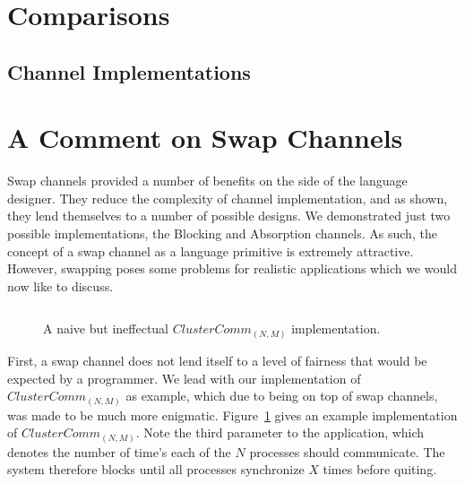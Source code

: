\section{Comparisons}\label{sec:results-comparisons}


\subsection{Channel Implementations}\label{sec:results-channel-implementations}


\section{A Comment on Swap Channels}\label{sec:results-swap-channels}

Swap channels provided a number of benefits on the side of the language 
designer. They reduce the complexity of channel implementation, and as shown, 
they lend themselves to a number of possible designs. We demonstrated just two 
possible implementations, the Blocking and Absorption channels. As such, the 
concept of a swap channel as a language primitive is extremely attractive. 
However, swapping poses some problems for realistic applications which we would
now like to discuss.

\begin{figure}
\centering
\inputminted[frame=lines,fontsize=\footnotesize]{csharp}{code/badclustercomm.els}
\caption{A naive but ineffectual $ClusterComm_{(N,M)}$ implementation.} 
\label{fig:bad-clustercomm}
\end{figure}

First, a swap channel does not lend itself to a level of fairness that would be
expected by a programmer. We lead with our implementation of 
$ClusterComm_{(N,M)}$ as example, which due to being on top of swap channels, 
was made to be much more enigmatic. Figure~\ref{fig:bad-clustercomm} gives an
example implementation of $ClusterComm_{(N,M)}$. Note the third parameter to
the application, which denotes the number of time's each of the $N$ processes
should communicate. The system therefore blocks until all processes synchronize
$X$ times before quiting.

